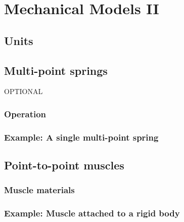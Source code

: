 \section{Mechanical Models II}
\label{MechModelsII:sec}

\subsection{Units}

\subsection{Multi-point springs}

OPTIONAL

\subsubsection{Operation}

\subsubsection{Example: A single multi-point spring}

%
%


\subsection{Point-to-point muscles}
\label{PointToPointMuscles:sec}

\subsubsection{Muscle materials}

\subsubsection{Example: Muscle attached to a rigid body}

